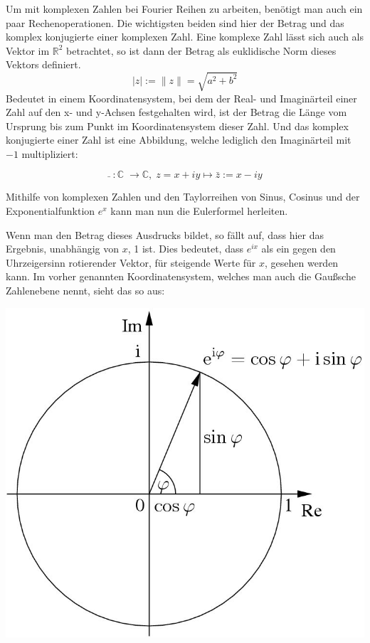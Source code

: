 \documentclass[a4paper,12pt]{article}
\theoremstyle{definition}
\theoremstyle{remark}
\begin{document}
Um mit komplexen Zahlen bei Fourier Reihen zu arbeiten, benötigt man auch ein paar Rechenoperationen. Die wichtigsten beiden sind hier der Betrag und das komplex konjugierte einer komplexen Zahl. Eine komplexe Zahl lässt sich auch als Vektor im $\mathbb{R}^2$ betrachtet, so ist dann der Betrag als euklidische Norm dieses Vektors definiert. 
$$\vert{z}\vert := \|z\| = \sqrt{ a^2 + b^2}$$
Bedeutet in einem Koordinatensystem, bei dem der Real- und Imaginärteil einer Zahl auf den x- und y-Achsen festgehalten wird, ist der Betrag die Länge vom Ursprung bis zum Punkt im Koordinatensystem dieser Zahl. 
Und das komplex konjugierte einer Zahl ist eine Abbildung, welche lediglich den Imaginärteil mit $-1$ multipliziert:

$$\bar{}\;:\mathbb{C}\;\to\mathbb{C},\; z = x+iy \mapsto \bar{z} := x-iy$$

Mithilfe von komplexen Zahlen und den Taylorreihen von Sinus, Cosinus und der Exponentialfunktion $e^x$ kann man nun die Eulerformel herleiten. 


Wenn man den Betrag dieses Ausdrucks bildet, so fällt auf, dass hier das Ergebnis, unabhängig von $x$, 1 ist. Dies bedeutet, dass $e^{ix}$ als ein gegen den Uhrzeigersinn rotierender Vektor, für steigende Werte für $x$, gesehen werden kann. Im vorher genannten Koordinatensystem, welches man auch die Gaußsche Zahlenebene nennt, sieht das so aus:
\begin{center}
\includegraphics[scale=0.75]{eulerformel.jpg}
\end{center}
\end{document}
